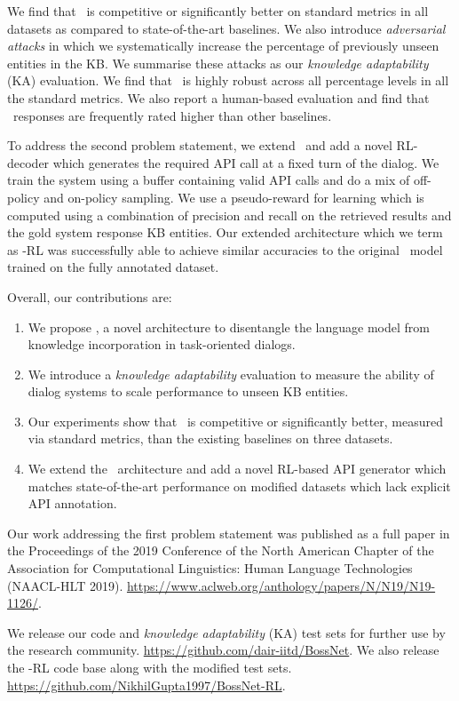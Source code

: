 We find that \sys\ is competitive or significantly better on standard metrics in all datasets as compared to state-of-the-art baselines. We also introduce {\em adversarial attacks} in which we systematically increase the percentage of previously unseen entities in the KB. We summarise these attacks as our {\em knowledge adaptability} (KA) evaluation. We find that \sys\ is highly robust across all percentage levels in all the standard metrics. We also report a human-based evaluation and find that \sys\ responses are frequently rated higher than other baselines.

To address the second problem statement, we extend \sys\ and add a novel RL-decoder which generates the required API call at a fixed turn of the dialog. We train the system using a buffer containing valid API calls and do a mix of off-policy and on-policy sampling. We use a pseudo-reward for learning which is computed using a combination of precision and recall on the retrieved results and the gold system response KB entities. Our extended architecture which we term as \sys -RL was successfully able to achieve similar accuracies to the original \sys\ model trained on the fully annotated dataset. \\

\pagebreak

Overall, our contributions are:

\begin{enumerate}
 \item We propose \sys, a novel architecture to disentangle the language model from knowledge incorporation in task-oriented dialogs.
 \item We introduce a {\em knowledge adaptability} evaluation to measure the ability of dialog systems to scale performance to unseen KB entities.
 \item Our experiments show that \sys\ is competitive or significantly better, measured via standard metrics, than the existing baselines on three datasets.
 \item We extend the \sys\ architecture and add a novel RL-based API generator which matches state-of-the-art performance on modified datasets which lack explicit API annotation.
\end{enumerate}

Our work addressing the first problem statement was published as a full paper in the Proceedings of the 2019 Conference of the North American Chapter of the Association for Computational Linguistics: Human Language Technologies (NAACL-HLT 2019). \url{https://www.aclweb.org/anthology/papers/N/N19/N19-1126/}.

We release our code and {\em knowledge adaptability} (KA) test sets for further use by the research community. \url{ https://github.com/dair-iitd/BossNet}. We also release the \sys -RL code base along with the modified test sets. \url{ https://github.com/NikhilGupta1997/BossNet-RL}.

